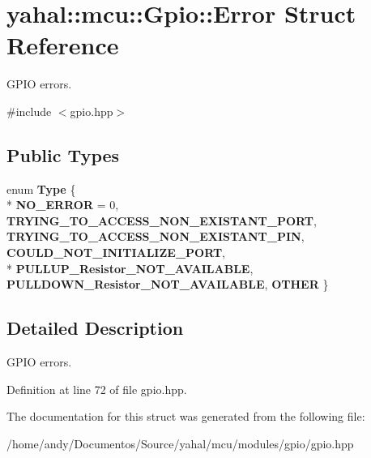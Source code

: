 \hypertarget{structyahal_1_1mcu_1_1_gpio_1_1_error}{}\section{yahal\+:\+:mcu\+:\+:Gpio\+:\+:Error Struct Reference}
\label{structyahal_1_1mcu_1_1_gpio_1_1_error}


G\+P\+I\+O errors.  




{\ttfamily \#include $<$gpio.\+hpp$>$}

\subsection*{Public Types}
\begin{DoxyCompactItemize}
\item 
\hypertarget{structyahal_1_1mcu_1_1_gpio_1_1_error_a3cdf8682538fd41409200af5008458af}{}enum {\bfseries Type} \{ \\*
{\bfseries N\+O\+\_\+\+E\+R\+R\+O\+R} = 0, 
{\bfseries T\+R\+Y\+I\+N\+G\+\_\+\+T\+O\+\_\+\+A\+C\+C\+E\+S\+S\+\_\+\+N\+O\+N\+\_\+\+E\+X\+I\+S\+T\+A\+N\+T\+\_\+\+P\+O\+R\+T}, 
{\bfseries T\+R\+Y\+I\+N\+G\+\_\+\+T\+O\+\_\+\+A\+C\+C\+E\+S\+S\+\_\+\+N\+O\+N\+\_\+\+E\+X\+I\+S\+T\+A\+N\+T\+\_\+\+P\+I\+N}, 
{\bfseries C\+O\+U\+L\+D\+\_\+\+N\+O\+T\+\_\+\+I\+N\+I\+T\+I\+A\+L\+I\+Z\+E\+\_\+\+P\+O\+R\+T}, 
\\*
{\bfseries P\+U\+L\+L\+U\+P\+\_\+\+Resistor\+\_\+\+N\+O\+T\+\_\+\+A\+V\+A\+I\+L\+A\+B\+L\+E}, 
{\bfseries P\+U\+L\+L\+D\+O\+W\+N\+\_\+\+Resistor\+\_\+\+N\+O\+T\+\_\+\+A\+V\+A\+I\+L\+A\+B\+L\+E}, 
{\bfseries O\+T\+H\+E\+R}
 \}\label{structyahal_1_1mcu_1_1_gpio_1_1_error_a3cdf8682538fd41409200af5008458af}

\end{DoxyCompactItemize}


\subsection{Detailed Description}
G\+P\+I\+O errors. 

Definition at line 72 of file gpio.\+hpp.



The documentation for this struct was generated from the following file\+:\begin{DoxyCompactItemize}
\item 
/home/andy/\+Documentos/\+Source/yahal/mcu/modules/gpio/gpio.\+hpp\end{DoxyCompactItemize}
